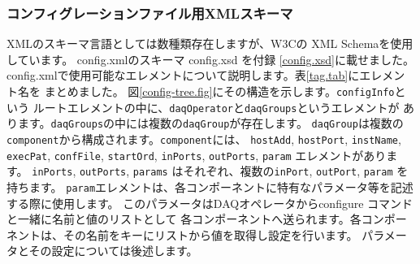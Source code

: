\documentclass[a4j,10pt,dvips,onecolumn,oneside,final]{jarticle}%
\begin{document}
\subsubsection{コンフィグレーションファイル用XMLスキーマ}\label{config-schema}
XMLのスキーマ言語としては数種類存在しますが、W3Cの XML Schemaを使用しています。
config.xmlのスキーマ config.xsd を付録 \ref{config.xsd}に載せました。
config.xmlで使用可能なエレメントについて説明します。表\ref{tag.tab}にエレメント名を
まとめました。
図\ref{config-tree.fig}にその構造を示します。\verb|configInfo|という
ルートエレメントの中に、\verb|daqOperator|と\verb|daqGroups|というエレメントが
あります。\verb|daqGroups|の中には複数の\verb|daqGroup|が存在します。
\verb|daqGroup|は複数の \verb|component|から構成されます。\verb|component|には、
\verb|hostAdd|, \verb|hostPort|, \verb|instName|, \verb|execPat|, \verb|confFile|,
\verb|startOrd|, \verb|inPorts|, \verb|outPorts|, \verb|param| エレメントがあります。
\verb|inPorts|, \verb|outPorts|, \verb|params| はそれぞれ、複数の\verb|inPort|,
\verb|outPort|, \verb|param| を持ちます。
\verb|param|エレメントは、各コンポーネントに特有なパラメータ等を記述する際に使用します。
このパラメータはDAQオペレータからconfigure コマンドと一緒に名前と値のリストとして
各コンポーネントへ送られます。各コンポーネントは、その名前をキーにリストから値を取得し設定を行います。
パラメータとその設定については後述します。
\end{document}
